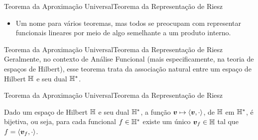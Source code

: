 \documentclass[13pt]{beamer}
\begin{document}

\begin{frame}{Teorema da Aproximação Universal}{Teorema da Representação de Riesz}
    \begin{itemize}
        \item Um nome para vários teoremas, mas todos se preocupam com representar funcionais lineares por meio de algo semelhante a um produto interno.
    \end{itemize}
\end{frame}

\begin{frame}{Teorema da Aproximação Universal}{Teorema da Representação de Riesz}%
    Geralmente, no contexto de Análise Funcional (mais especificamente, na teoria de espaços de Hilbert), esse teorema trata da associação natural entre um espaço de Hilbert \( \mathbb{H} \) e seu dual \( \mathbb{H}^{ * } \).
\end{frame}

\begin{frame}{Teorema da Aproximação Universal}{Teorema da Representação de Riesz}%
    \begin{teo*}
        Dado um espaço de Hilbert \( \mathbb{H} \) e seu dual \( \mathbb{H}^{ * } \), a função \( \bm{v} \mapsto \langle \bm{v}, \cdot \rangle \), de \( \mathbb{H} \) em \( \mathbb{H}^{ * } \),  é bijetiva, ou seja, para cada funcional \( f \in \mathbb{H}^{ * } \) existe um único \( \bm{v}_{ f } \in \mathbb{H} \) tal que \( f = \langle\bm{v}_{ f }, \cdot\rangle \).
    \end{teo*}
\end{frame}
\end{document}
